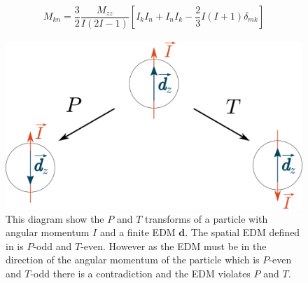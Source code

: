 \documentclass[8pt,a4paper, twoside]{report}
\begin{document}
\begin{align*}
M_{kn} = \dfrac{3}{2}\dfrac{M_{zz}}{I(2I-1)}\left[I_{k}I_{n} + I_{n}I_{k} - \dfrac{2}{3}I(I+1)\delta_{mk}\right]
\end{align*}
\begin{figure}
\includegraphics[scale=0.3]{./figures/EDM.eps}
\caption{\label{fig:ParityTimeEDM} This diagram show the $P$ and $T$ transforms of a particle with angular momentum $I$ and a finite EDM $\textbf{d}$. The spatial EDM defined in  is $P$-odd and $T$-even. However as the EDM must be in the direction of the angular momentum of the particle which is $P$-even and $T$-odd there is a contradiction and the EDM violates $P$ and $T$.}
\end{figure}
\end{document}
